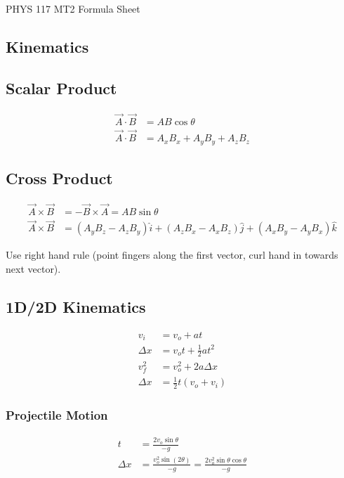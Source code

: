 \documentclass[letterpaper,10pt]{article}
\begin{document}
PHYS 117 MT2 Formula Sheet

\begin{multicols}{2}
\section{Kinematics}
\subsection{Scalar Product}
\begin{align*}
    \vec{A} \cdot \vec{B} &= AB \cos \theta \\
    \vec{A} \cdot \vec{B} &= A_x B_x + A_y B_y + A_z B_z
\end{align*}

\subsection{Cross Product}
\begin{align*}
    \vec{A} \times \vec{B} &= - \vec{B} \times \vec{A} = AB \sin \theta \\
    \vec{A} \times \vec{B} &= \left( A_y B_z - A_z B_y \right) \hat{i}
                            + \left( A_z B_x - A_x B_z \right) \hat{j}
                            + \left( A_x B_y - A_y B_x \right) \hat{k}
\end{align*}

Use right hand rule (point fingers along the first vector, curl hand in towards next vector).

\subsection{1D/2D Kinematics}
\begin{align*}
    v_i &= v_o + at \\
    \Delta x &= v_o t + \tfrac{1}{2} at^2 \\
    v_f^2 &= v_o^2 + 2 a \Delta x \\
    \Delta x &= \tfrac{1}{2} t \left( v_o + v_i \right)
\end{align*}

\subsubsection{Projectile Motion}
\begin{align*}
    t &= \frac{2 v_o \sin \theta}{-g} \\
    \Delta x &= \frac{v_o^2 \sin \left( 2 \theta \right)}{-g}
              = \frac{2 v_o^2 \sin \theta \cos \theta}{-g} \\
\end{align*}


\end{multicols}
\end{document}
